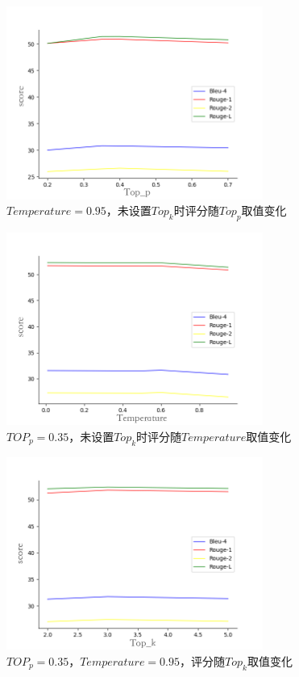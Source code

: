 \documentclass[
    decl-page,  %
    ,fontset = win, %
  ]{njuthesis}
\begin{document}
\begin{figure}[H]
  \centering
  \includegraphics[width=0.75\textwidth]{image/Top-p-score.png}
  \caption{$Temperature=0.95$，未设置$Top_k$时评分随$Top_p$取值变化}
  \label{topp}
\end{figure}

\begin{figure}[H]
  \centering
  \includegraphics[width=0.75\textwidth]{image/Temperature-score.png}
  \caption{$TOP_p=0.35$，未设置$Top_k$时评分随$Temperature$取值变化}
  \label{temp}
\end{figure}

\begin{figure}[H]
  \centering
  \includegraphics[width=0.75\textwidth]{image/Top-k-score.png}
  \caption{$TOP_p=0.35$，$Temperature=0.95$，评分随$Top_k$取值变化}
  \label{topk}
\end{figure}
\end{document}
